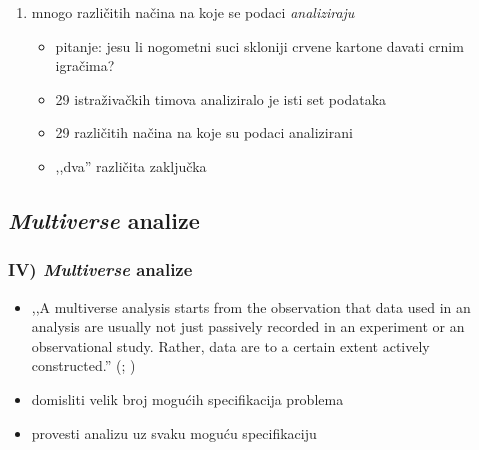 \documentclass[aspectratio=169]{beamer}
\newcounter{saveenumi}
\newcommand{\conti}{\setcounter{enumi}{\value{saveenumi}}}
\newcommand{\tinycitep}[1]{%
    \bgroup
    \scriptsize
    \citep{#1}
    \egroup}
\begin{document}
\begin{frame}
    \begin{enumerate}
        \conti

        \item mnogo različitih načina na koje se podaci \emph{analiziraju}
            \tinycitep{silberzahnManyAnalystsOne2018}

            \begin{itemize}
                \item pitanje: jesu li nogometni suci skloniji crvene kartone
                    davati crnim igračima?

                \pause

                \item 29 istraživačkih timova analiziralo je isti set
                    podataka

                \pause

                \item 29 različitih načina na koje su podaci analizirani

                \pause

                \item ,,dva'' različita zaključka
            \end{itemize}

    \end{enumerate}
\end{frame}

\subsection{\textit{Multiverse} analize}

\begin{frame}
    \frametitle{IV) \textit{Multiverse} analize}

    \begin{itemize}
        \item ,,A multiverse analysis starts from the observation that data used
            in an analysis are usually not just passively recorded in an
            experiment or an observational study.  Rather, data are to a certain
            extent actively constructed.''
            \bgroup
            \scriptsize
            (\citealp*[str. 702]{steegenIncreasingTransparencyMultiverse2016};
            \citealp*[za sličan pristup
            vidi][]{simonsohnSpecificationCurveDescriptive2015})
            \egroup

        \pause

        \item domisliti velik broj mogućih specifikacija problema

        \item provesti analizu uz svaku moguću specifikaciju

    \end{itemize}

\end{frame}
\end{document}
